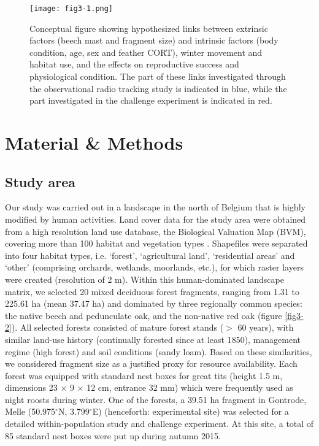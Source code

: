 \documentclass[10pt, twoside]{book} %
\begin{document}
	
\begin{figure}[h]
	\begin{center}
		\texttt{[image: fig3-1.png]}
	\end{center}
	\caption{Conceptual figure showing hypothesized links between extrinsic factors (beech mast and fragment size) and intrinsic factors (body condition, age, sex and feather CORT), winter movement and habitat use, and the effects on reproductive success and physiological condition. The part of these links investigated through the observational radio tracking study is indicated in blue, while the part investigated in the challenge experiment is indicated in red.}\label{fig3-1}
\end{figure}	
\clearpage	
	
	
	\section{Material \& Methods}
	\subsection*{Study area}
	
Our study was carried out in a landscape in the north of Belgium that is highly modified by human activities. Land cover data for the study area were obtained from a high resolution land use database, the Biological Valuation Map (BVM), covering more than 100 habitat and vegetation types \citep{Vriens2011}. Shapefiles were separated into four habitat types, i.e. `forest', `agricultural land', `residential areas' and `other' (comprising orchards, wetlands, moorlands, etc.), for which raster layers were created (resolution of 2 m). Within this human-dominated landscape matrix, we selected 20 mixed deciduous forest fragments, ranging from 1.31 to 225.61 ha (mean 37.47 ha) and dominated by three regionally common species: the native beech and pedunculate oak, and the non-native red oak (figure \ref{fig3-2}). All selected forests consisted of mature forest stands ($>$ 60 years), with similar land-use history (continually forested since at least 1850), management regime (high forest) and soil conditions (sandy loam). Based on these similarities, we considered fragment size as a justified proxy for resource availability. Each forest was equipped with standard nest boxes for great tits (height 1.5 m, dimensions 23 $\times$ 9 $\times$ 12 cm, entrance 32 mm) which were frequently used as night roosts during winter. One of the forests, a 39.51 ha fragment in Gontrode, Melle (50.975$^{\circ}$N, 3.799$^{\circ}$E) (henceforth: experimental site) was selected for a detailed within-population study and challenge experiment. At this site, a total of 85 standard nest boxes were put up during autumn 2015.\\
\end{document}

